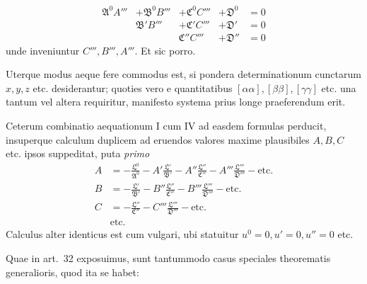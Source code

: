 \[
\begin{array}{rlllll}
\mathfrak{A}^0A'''&+\mathfrak{B}^0B'''&+\mathfrak{C}^0C'''&+\mathfrak{D}^0&=0\\
&\mathfrak{B}'B'''&+\mathfrak{C}'C'''&+\mathfrak{D}'&=0\\
&&\mathfrak{C}''C'''&+\mathfrak{D}''&=0
\end{array}
\]
unde inveniuntur \(C''',B''',A'''\). Et sic porro.

Uterque modus aeque fere commodus est, si pondera determinationum cunctarum \(x,y,z\) etc. desiderantur; quoties vero e quantitatibus \([\alpha\alpha],\allowbreak[\beta\beta],\allowbreak[\gamma\gamma]\) etc. una tantum vel altera requiritur, manifesto systema prius longe praeferendum erit.

Ceterum combinatio aequationum I cum IV ad easdem formulas perducit, insuperque calculum duplicem ad eruendos valores maxime plausibiles \(A,B,C\) etc. ipsos suppeditat, puta \textit{primo}
\[
\begin{aligned}
A&=-\frac{\mathfrak{L}^0}{\mathfrak{A}^0}-A'\frac{\mathfrak{L}'}{\mathfrak{B}'}-A''\frac{\mathfrak{L}''}{\mathfrak{C}''}-A'''\frac{\mathfrak{L}'''}{\mathfrak{D}'''}-\text{etc.}\\[4pt]
B&=-\frac{\mathfrak{L}'}{\mathfrak{B}'}-B''\frac{\mathfrak{L}''}{\mathfrak{C}''}-B'''\frac{\mathfrak{L}'''}{\mathfrak{D}'''}-\text{etc.}\\[4pt]
C&=-\frac{\mathfrak{L}''}{\mathfrak{C}''}-C'''\frac{\mathfrak{L}'''}{\mathfrak{D}'''}-\text{etc.}\\
&\text{etc.}
\end{aligned}
\]
Calculus alter identicus est cum vulgari, ubi statuitur \(u^0=0,\allowbreak u'=0,\allowbreak u''=0\) etc.

Quae in art.\ 32 exposuimus, sunt tantummodo casus speciales theorematis generalioris, quod ita se habet:

